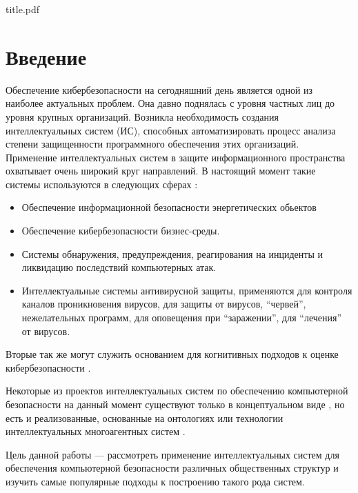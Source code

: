 

\def\oldbibitem{}
\let\oldbibitem=\bibitem
\def\bibitem{\stepcounter{citenum}\oldbibitem}



{title.pdf}

\tableofcontents
\newpage

\section{Введение}
Обеспечение кибербезопасности на сегодняшний день является одной из наиболее актуальных проблем.
Она давно поднялась с уровня частных лиц до уровня крупных организаций. Возникла необходимость
создания интеллектуальных систем (ИС), способных автоматизировать процесс анализа степени защищенности
программного обеспечения этих организаций. Применение интеллектуальных систем в защите
информационного пространства охватывает очень широкий круг направлений.
В настоящий момент такие системы используются в следующих сферах \cite{spheres}:

\begin{itemize}
\item
Обеспечение информационной безопасности энергетических обьектов
\item
Обеспечение кибербезопасности бизнес-среды.
\item
Системы обнаружения,
предупреждения, реагирования на инциденты и ликвидацию последствий компьютерных атак.
\item
Интеллектуальные системы антивирусной защиты, применяются для контроля каналов проникновения вирусов,
для защиты от вирусов, ``червей'', нежелательных программ, для оповещения при ``заражении'', для ``лечения''
от вирусов.
\end{itemize}

Вторые так же могут служить основанием для когнитивных подходов к оценке кибербезопасности \cite{kognmodels}.

Некоторые из проектов интеллектуальных систем по обеспечению компьютерной безопасности
на данный момент существуют только в концептуальном виде \cite{concept}, но есть и реализованные,
основанные на онтологиях или технологии интеллектуальных многоагентных систем \cite{multigent}.

Цель данной работы --- рассмотреть применение интеллектуальных систем для обеспечения компьютерной
безопасности различных общественных структур и изучить самые популярные подходы
к построению такого рода систем.

